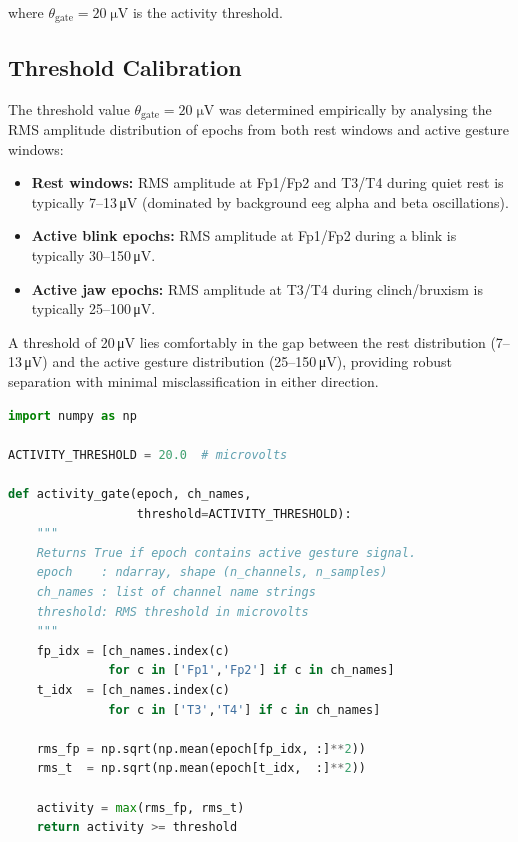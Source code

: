 \noindent where $\theta_{\text{gate}} = 20\;\si{\micro\volt}$
is the activity threshold.

\subsection{Threshold Calibration}

The threshold value $\theta_{\text{gate}} = 20\;\si{\micro\volt}$
was determined empirically by analysing the RMS amplitude
distribution of epochs from both rest windows and active
gesture windows:

\begin{itemize}[leftmargin=*]
    \item \textbf{Rest windows:} RMS amplitude at Fp1/Fp2 and
    T3/T4 during quiet rest is typically
    7--13\,\si{\micro\volt} (dominated by background
    \acrshort{eeg} alpha and beta oscillations).
    \item \textbf{Active blink epochs:} RMS amplitude at
    Fp1/Fp2 during a blink is typically
    30--150\,\si{\micro\volt}.
    \item \textbf{Active jaw epochs:} RMS amplitude at T3/T4
    during clinch/bruxism is typically
    25--100\,\si{\micro\volt}.
\end{itemize}

A threshold of 20\,\si{\micro\volt} lies comfortably in the
gap between the rest distribution (7--13\,\si{\micro\volt})
and the active gesture distribution (25--150\,\si{\micro\volt}),
providing robust separation with minimal misclassification
in either direction.

\begin{lstlisting}[language=Python,
    caption={Activity gate implementation.},
    label={lst:gate}]
import numpy as np

ACTIVITY_THRESHOLD = 20.0  # microvolts

def activity_gate(epoch, ch_names,
                  threshold=ACTIVITY_THRESHOLD):
    """
    Returns True if epoch contains active gesture signal.
    epoch    : ndarray, shape (n_channels, n_samples)
    ch_names : list of channel name strings
    threshold: RMS threshold in microvolts
    """
    fp_idx = [ch_names.index(c)
              for c in ['Fp1','Fp2'] if c in ch_names]
    t_idx  = [ch_names.index(c)
              for c in ['T3','T4'] if c in ch_names]

    rms_fp = np.sqrt(np.mean(epoch[fp_idx, :]**2))
    rms_t  = np.sqrt(np.mean(epoch[t_idx,  :]**2))

    activity = max(rms_fp, rms_t)
    return activity >= threshold
\end{lstlisting}

